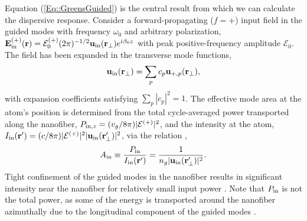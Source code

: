 \documentclass[preprint,aps,pra,onecolumn]{revtex4-1} %
\newcommand{\inp}{{\rm in}}
\newcommand{\fwd}{+}
\begin{document}
Equation (\ref{Eq::GreensGuided}) is the central result from which we can calculate the dispersive response.  Consider a forward-propagating ($f=+$) input field in the guided modes with frequency $\omega_0$ and arbitrary polarization, $\mathbf{E}^{(+)}_{\inp}(\br) = \mathcal{E}^{(+)}_0 (2\pi)^{-1/2} \mathbf{u}_{\rm in}(\br_\perp) e^{i \beta_0 z}$ with peak positive-frequency amplitude $\mathcal{E}_0$. The field has been expanded in the transverse mode functions,
	\begin{align} \label{Eq::uin}
		\mbf{u}_{\rm in}(\mbf{r}_\perp) = \sum_{p} c_{p} \mathbf{u}_{\fwd,p}(\br_\perp),
	\end{align}
with expansion coefficients satisfying $\sum_{p} |c_{p}|^2 = 1$.  The effective mode area at the atom's position is determined from the total cycle-averaged power transported along the nanofiber, $P_{{\rm in},z} = (v_g/8\pi) |\mathcal{E}^{(+)}|^2$, and the intensity at the atom, $I_{\rm in}(\mathbf{r}') = (c/8\pi)|\mathcal{E}^{(+)}|^2|\mathbf{u}_{\rm in}(\mathbf{r}_\perp')|^2$, via the relation \cite{domokos_quantum_2002},
 	\begin{align} \label{Eq::AreaIn}
 		A_{\rm in} \equiv \frac{P_{{\rm in}}}{I_{\rm in}(\mathbf{r}')} = \frac{1}{n_g |\mathbf{u}_{\rm in}(\mathbf{r}'_\perp)|^{2}}.
	\end{align}
Tight confinement of the guided modes in the nanofiber results in significant intensity near the nanofiber for relatively small input power \cite{bures_power_1999}.  Note that $P_{\rm in}$ is not the total power, as some of the energy is transported around the nanofiber azimuthally due to the longitudinal component of the guided modes \cite{le_kien_scattering_2006}.
\end{document}
